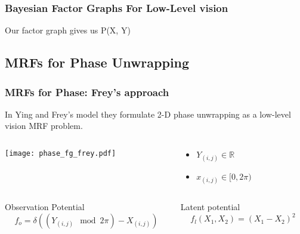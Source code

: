 \documentclass{beamer}
\begin{document}
\begin{frame}
\frametitle{Bayesian Factor Graphs For Low-Level vision}
Our factor graph gives us P(X, Y) 

\end{frame}

\subsection{MRFs for Phase Unwrapping}

\begin{frame} 
  \frametitle{MRFs for Phase: Frey's approach}
  In Ying and Frey's model \cite{Ying_Unwrapping_2006} they formulate 2-D phase
  unwrapping as a low-level vision MRF problem. 
  
  \begin{columns}
    \begin{column}{5cm}
      \texttt{[image: phase\_fg\_frey.pdf]}
    \end{column}
    \begin{column}{5cm}
      \begin{itemize}
      \item $Y_{(i, j)} \in \mathbb{R}$
      \item $x_{(i, j)} \in [0, 2\pi)$
      \end{itemize}
    \end{column}
  \end{columns}
  
  
  \begin{columns}
    \begin{column}{5cm}
      \begin{block}{Observation Potential}
        \begin{equation*}
          f_o = \delta ((Y_{(i, j)}\mod 2\pi) - X_{(i, j)})
        \end{equation*}
      \end{block}
    \end{column}

    \begin{column}{5cm}
      \begin{block}{Latent potential} 
        \begin{equation*}
          f_l(X_1, X_2) = (X_1 - X_2)^2
        \end{equation*}
      \end{block}
    \end{column}
    
  \end{columns}
  
\end{frame}
\end{document}
